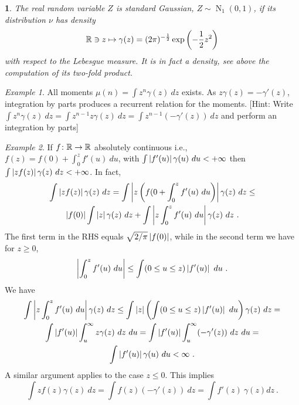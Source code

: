 \documentclass[12pt,a4paper]{amsart}
\newcommand{\gaussian}[3]{\operatorname{N}_{#1}\left(#2,#3\right)}
\theoremstyle{plain}%
\newtheorem{npar}{}%
\theoremstyle{definition}
\theoremstyle{remark}
\newtheorem{example}{Example}
\begin{document}
\begin{npar}\normalfont  The real random variable $Z$ is \emph{standard Gaussian}, $Z \sim \gaussian 1 0 1$, if its distribution $\nu$ has density
  \begin{equation*}
    \mathbb{R} \ni z \mapsto \gamma(z) = (2\pi)^{-\frac12} \exp\left(-\frac12 z^2\right)
  \end{equation*}
%
  with respect to the Lebesgue measure. It is in fact a density, see above the computation of its two-fold product.
\end{npar}
  \begin{example}
All moments $\mu(n) = \int z^n\gamma(z) \ dz$ exists. As $z\gamma(z) = -\gamma'(z)$, integration by parts produces a recurrent relation for the moments. [Hint: Write $\int z^n \gamma(z) \ dz = \int z^{n-1} z \gamma(z) \ dz = \int z^{n-1} (-\gamma'(z)) \  dz$ and perform an integration by parts]
\end{example}

\begin{example}  If $f \colon \mathbb{R} \to \mathbb{R}$ absolutely continuous i.e., $f(z) = f(0) + \int_0^z f'(u) \ du$, with
$\int \left\vert f'(u)\right\vert \gamma(u) \ du < +\infty$ then
$\int \left\vert zf(z)\right\vert\gamma(z) \ dz < +\infty$. In fact,
\begin{multline*}
  \int \left\vert zf(z)\right\vert\gamma(z) \ dz = \int \left\vert z\left(f(0 + \int_0^z f'(u) \ du \right)\right\vert\gamma(z) \ dz \le \\ \left\vert f(0)\right\vert \int \left\vert z\right\vert \gamma(z) \ dz + \int \left\vert z \int_0^z f'(u) \ du\right\vert \gamma(z) \ dz \ .
\end{multline*}
The first term in the RHS equals $\sqrt{2/\pi} \left\vert f(0)\right\vert$, while in the second term we have for $z \ge 0$,
\begin{equation*}
  \left\vert\int_0^z f'(u) \ du\right\vert \le \int (0 \leq u \leq z)\left\vert f'(u)\right\vert \ du \ .
\end{equation*}
We have
\begin{multline*}
  \int \left\vert z \int_0^z f'(u) \ du\right\vert \gamma(z) \ dz \leq \int \left\vert z\right\vert \left(\int (0 \leq u \leq z) \left\vert f'(u)\right\vert \ du \right) \gamma(z) \ dz = \\ \int \left\vert f'(u)\right\vert \int_u^\infty z \gamma(z) \ dz \ du = \int \left\vert f'(u)\right\vert \int_u^\infty (-\gamma'(z)) \ dz \ du = \\
  \int \left\vert f'(u)\right\vert \gamma(u) \ du < \infty \ .
\end{multline*}
A similar argument applies to the case $z \le 0$. This implies
\begin{equation*}
  \int zf(z) \gamma(z) \ dz = \int f(z) (-\gamma'(z)) \  dz = \int f'(z) \ \gamma(z)dz \ .
\end{equation*}
\end{example}
\end{document}
